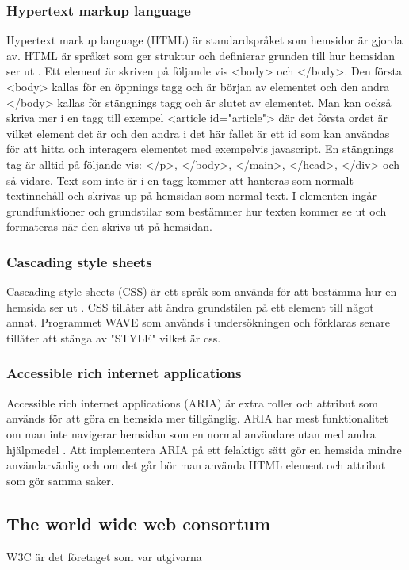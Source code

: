 \documentclass[11p]{article}
\begin{document}
    \subsubsection{Hypertext markup language}
    Hypertext markup language (HTML) är standardspråket som hemsidor är gjorda av.
    HTML är språket som ger struktur och definierar grunden till hur hemsidan ser ut \parencite{HTML}.
    Ett element är skriven på följande vis <body> och </body>.
    Den första <body> kallas för en öppnings tagg och är början av elementet och den andra </body> kallas för stängnings tagg och är slutet av elementet.
    Man kan också skriva mer i en tagg till exempel <article id="article"> där det första ordet är vilket element det är och den andra i det här fallet är ett id som kan användas för att hitta och interagera elementet med exempelvis javascript.
    En stängnings tag är alltid på följande vis: </p>, </body>, </main>, </head>, </div> och så vidare.
    Text som inte är i en tagg kommer att hanteras som normalt textinnehåll och skrivas up på hemsidan som normal text.
    I elementen ingår grundfunktioner och grundstilar som bestämmer hur texten kommer se ut och formateras när den skrivs ut på hemsidan.

    \subsubsection{Cascading style sheets}
    Cascading style sheets (CSS) är ett språk som används för att bestämma hur en hemsida ser ut \parencite{CSS}.
    CSS tillåter att ändra grundstilen på ett element till något annat.
    Programmet WAVE som används i undersökningen och förklaras senare tillåter att stänga av "STYLE" vilket är css.
    
    \subsubsection{Accessible rich internet applications}
    Accessible rich internet applications (ARIA) är extra roller och attribut som används för att göra en hemsida mer tillgänglig.
    ARIA har mest funktionalitet om man inte navigerar hemsidan som en normal användare utan med andra hjälpmedel \parencite{ARIA}.
    Att implementera ARIA på ett felaktigt sätt gör en hemsida mindre användarvänlig och om det går bör man använda HTML element och attribut som gör samma saker.
    
    \subsection{The world wide web consortum}
    W3C är det företaget som var utgivarna
\end{document}
